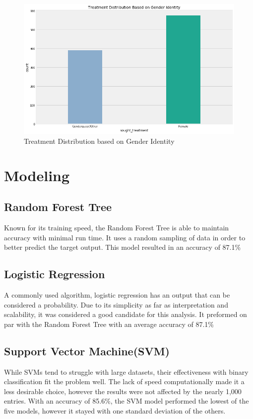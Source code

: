 \documentclass{article}
\begin{document}
\begin{figure}
  \includegraphics[width=\linewidth]{treatment.png}
  \caption{Treatment Distribution based on Gender Identity}
  \label{fig:treatment}
\end{figure}
\section{Modeling} 

\subsection{Random Forest Tree}
Known for its training speed, the Random Forest Tree is able to maintain accuracy with minimal run time. It uses a random sampling of data in order to better predict the target output. This model resulted in an accuracy of 87.1\%
\subsection{Logistic Regression}
A commonly used algorithm, logistic regression has an output that can be considered a probability. Due to its simplicity as far as interpretation and scalability, it was considered a good candidate for this analysis. It preformed on par with the Random Forest Tree with an average accuracy of 87.1\%
\subsection{Support Vector Machine(SVM)}
While SVMs tend to struggle with large datasets, their effectiveness with binary classification fit the problem well. The lack of speed computationally made it a less desirable choice, however the results were not affected by the nearly 1,000 entries. With an accuracy of 85.6\%, the SVM model performed the lowest of the five models, however it stayed with one standard deviation of the others. 
\end{document}
